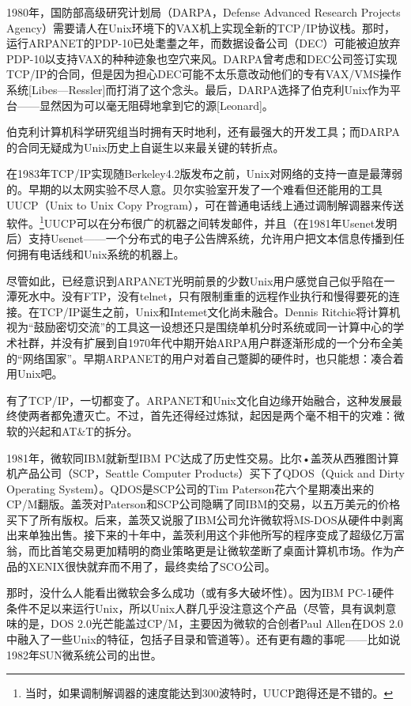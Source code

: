 \documentclass[11pt,oneside]{book}
\begin{document}
\begin{common-format}
1980年，国防部高级研究计划局（DARPA，Defense Advanced Research Projects Agency）需要请人在Unix环境下的VAX机上实现全新的TCP/IP协议栈。那时，运行ARPANET的PDP-10已处耄耋之年，而数据设备公司（DEC）可能被迫放弃PDP-10以支持VAX的种种迹象也空穴来风。DARPA曾考虑和DEC公司签订实现TCP/IP的合同，但是因为担心DEC可能不太乐意改动他们的专有VAX/VMS操作系统[Libes—Ressler]而打消了这个念头。最后，DARPA选择了伯克利Unix作为平台——显然因为可以毫无阻碍地拿到它的源[Leonard]。

伯克利计算机科学研究组当时拥有天时地利，还有最强大的开发工具；而DARPA的合同无疑成为Unix历史上自诞生以来最关键的转折点。

在1983年TCP/IP实现随Berkeley4.2版发布之前，Unix对网络的支持一直是最薄弱的。早期的以太网实验不尽人意。贝尔实验室开发了一个难看但还能用的工具UUCP（Unix to Unix Copy Program），可在普通电话线上通过调制解调器来传送软件。\footnote{当时，如果调制解调器的速度能达到300波特时，UUCP跑得还是不错的。}UUCP可以在分布很广的杌器之间转发邮件，并且（在1981年Usenet发明后）支持Usenet——一个分布式的电子公告牌系统，允许用户把文本信息传播到任何拥有电话线和Unix系统的机器上。

尽管如此，已经意识到ARPANET光明前景的少数Unix用户感觉自己似乎陷在一潭死水中。没有FTP，没有telnet，只有限制重重的远程作业执行和慢得要死的连接。在TCP/IP诞生之前，Unix和Intemet文化尚未融合。Dennis Ritchie将计算机视为“鼓励密切交流”的工具这一设想还只是围绕单机分时系统或同一计算中心的学术社群，并没有扩展到自1970年代中期开始ARPA用户群逐渐形成的一个分布全美的“网络国家”。早期ARPANET的用户对着自己蹩脚的硬件时，也只能想：凑合着用Unix吧。

有了TCP/IP，一切都变了。ARPANET和Unix文化自边缘开始融合，这种发展最终使两者都免遭灭亡。不过，首先还得经过炼狱，起因是两个毫不相干的灾难：微软的兴起和AT\&{}T的拆分。

1981年，微软同IBM就新型IBM PC达成了历史性交易。比尔•盖茨从西雅图计算机产品公司（SCP，Seattle Computer Products）买下了QDOS（Quick and Dirty Operating System）。QDOS是SCP公司的Tim Paterson花六个星期凑出来的CP/M翻版。盖茨对Paterson和SCP公司隐瞒了同IBM的交易，以五万美元的价格买下了所有版权。后来，盖茨又说服了IBM公司允许微软将MS-DOS从硬件中剥离出来单独出售。接下来的十年中，盖茨利用这个非他所写的程序变成了超级亿万富翁，而比首笔交易更加精明的商业策略更是让微软垄断了桌面计算机市场。作为产品的XENIX很快就弃而不用了，最终卖给了SCO公司。

那时，没什么人能看出微软会多么成功（或有多大破坏性）。因为IBM PC-1硬件条件不足以来运行Unix，所以Unix人群几乎没注意这个产品（尽管，具有讽刺意味的是，DOS 2.0光芒能盖过CP/M，主要因为微软的合创者Paul Allen在DOS 2.0中融入了一些Unix的特征，包括子目录和管道等）。还有更有趣的事呢——比如说1982年SUN微系统公司的出世。


\end{common-format}
\end{document}
